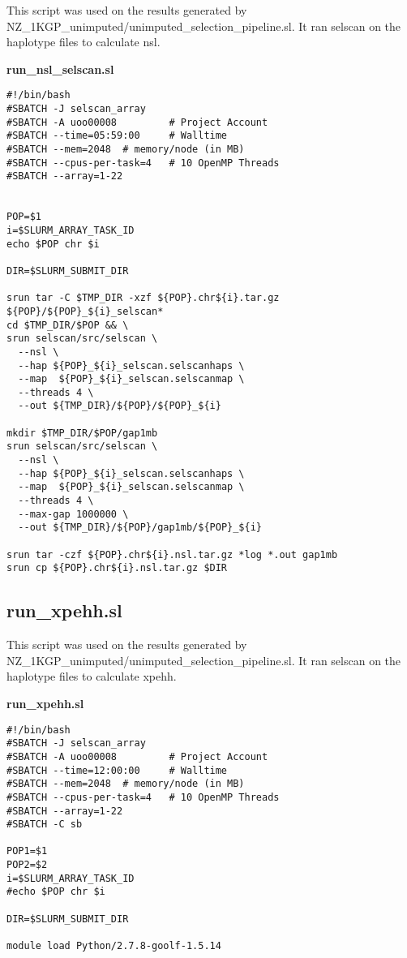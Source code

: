 \documentclass[]{report}
\begin{document}
\begin{appendices}
This script was used on the results generated by
NZ\_1KGP\_unimputed/unimputed\_selection\_pipeline.sl. It ran selscan on
the haplotype files to calculate \gls{nsl}.

\textbf{run\_nsl\_selscan.sl}

\begin{verbatim}
#!/bin/bash
#SBATCH -J selscan_array
#SBATCH -A uoo00008         # Project Account
#SBATCH --time=05:59:00     # Walltime
#SBATCH --mem=2048  # memory/node (in MB)
#SBATCH --cpus-per-task=4   # 10 OpenMP Threads
#SBATCH --array=1-22


POP=$1
i=$SLURM_ARRAY_TASK_ID
echo $POP chr $i

DIR=$SLURM_SUBMIT_DIR

srun tar -C $TMP_DIR -xzf ${POP}.chr${i}.tar.gz ${POP}/${POP}_${i}_selscan* 
cd $TMP_DIR/$POP && \
srun selscan/src/selscan \
  --nsl \
  --hap ${POP}_${i}_selscan.selscanhaps \
  --map  ${POP}_${i}_selscan.selscanmap \
  --threads 4 \
  --out ${TMP_DIR}/${POP}/${POP}_${i}
  
mkdir $TMP_DIR/$POP/gap1mb
srun selscan/src/selscan \
  --nsl \
  --hap ${POP}_${i}_selscan.selscanhaps \
  --map  ${POP}_${i}_selscan.selscanmap \
  --threads 4 \
  --max-gap 1000000 \
  --out ${TMP_DIR}/${POP}/gap1mb/${POP}_${i}
  
srun tar -czf ${POP}.chr${i}.nsl.tar.gz *log *.out gap1mb
srun cp ${POP}.chr${i}.nsl.tar.gz $DIR
\end{verbatim}

\subsection{run\_xpehh.sl}\label{run_xpehh.sl}

This script was used on the results generated by
NZ\_1KGP\_unimputed/unimputed\_selection\_pipeline.sl. It ran selscan on
the haplotype files to calculate \gls{xpehh}.

\textbf{run\_xpehh.sl}

\begin{verbatim}
#!/bin/bash
#SBATCH -J selscan_array
#SBATCH -A uoo00008         # Project Account
#SBATCH --time=12:00:00     # Walltime
#SBATCH --mem=2048  # memory/node (in MB)
#SBATCH --cpus-per-task=4   # 10 OpenMP Threads
#SBATCH --array=1-22
#SBATCH -C sb

POP1=$1
POP2=$2
i=$SLURM_ARRAY_TASK_ID
#echo $POP chr $i

DIR=$SLURM_SUBMIT_DIR

module load Python/2.7.8-goolf-1.5.14


\end{verbatim}
\end{appendices}
\end{document}
